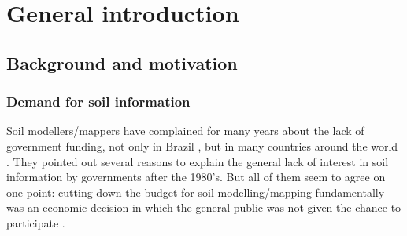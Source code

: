 \setcounter{page}{1}
\artigofalse
\chapter{General introduction}
\label{chap:introduction}


\section{Background and motivation}

\subsection{Demand for soil information}
\label{sec:intro-demand}

Soil modellers/mappers have complained for many years about the lack of government funding, not only
in Brazil \cite{Dalmolin1999,Ker1999,KerEtAl2003,Mendonca-SantosEtAl2003,Ramos2003,Espindola2008}, but in
many countries around the world \cite{Basher1997,HarteminkEtAl2008,Grunwald2009,SanchezEtAl2009,Finke2012}.
They pointed out several reasons to explain the general lack of interest in soil information by governments
after the 1980's. But all of them seem to agree on one point: cutting down the budget for soil
modelling/mapping fundamentally was an economic decision in which the general public was not given the
chance to participate \cite{SamuelRosa2012}.

